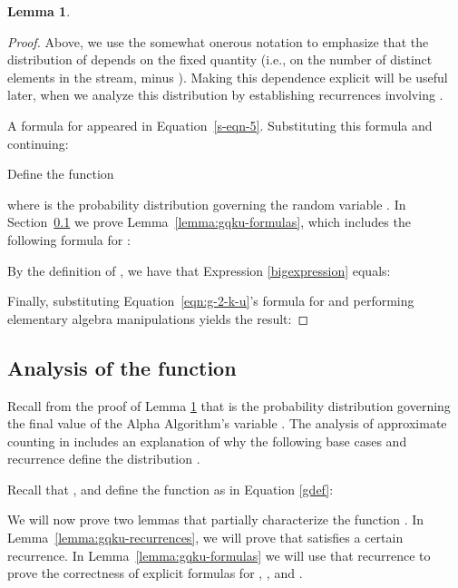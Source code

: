 \documentclass{article}
\newtheorem{lemma}[theorem]{Lemma}
\begin{document}
\begin{lemma}\label{lemma:e-z-sq}

\end{lemma}
\begin{proof}


Above, we use the somewhat onerous notation  to emphasize that the distribution
of  depends on the fixed quantity  (i.e., on the number of distinct elements in the stream, minus ). Making this dependence explicit
will be useful later, when we analyze this distribution by establishing recurrences involving .

A formula for  appeared in Equation~\eqref{s-eqn-5}. 
Substituting this formula and continuing:


 

Define the function



\noindent where  is the probability distribution 
governing the random variable .
In Section~\ref{gqku-section} we prove Lemma~\ref{lemma:gqku-formulas}, which includes the following 
formula for :



By the definition of , we have that Expression \eqref{bigexpression} equals:
 

\noindent Finally, substituting Equation~\eqref{eqn:g-2-k-u}'s formula for  and performing
elementary algebra manipulations yields the result:


\end{proof}




\subsection{Analysis of the function }\label{gqku-section}

Recall from the proof of Lemma \ref{lemma:e-z-sq} that  is the probability distribution
governing the final value of the Alpha Algorithm's variable . The analysis
of approximate counting in \cite{flajolet1985approximate} includes an explanation
of why the following base cases and
recurrence define the distribution .



Recall that , and define the function  as in Equation \eqref{gdef}:



We will now prove two lemmas that partially characterize the function .
In Lemma~\ref{lemma:gqku-recurrences},  
we will prove that  satisfies a certain recurrence. In Lemma~\ref{lemma:gqku-formulas}
we will use that recurrence to prove the correctness of explicit formulas for 
, , and .
\end{document}

